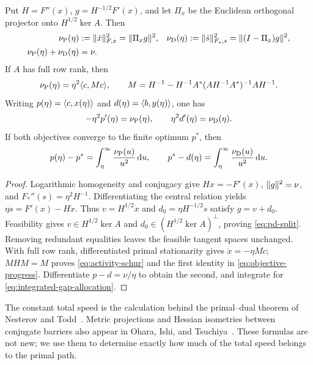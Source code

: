 \begin{proposition}
\label{prop:pd-split}
Put $H=F''(x)$, $g=H^{-1/2}F'(x)$, and let $\Pi_x$ be the Euclidean
orthogonal projector onto $H^{1/2}\ker A$. Then
\begin{align}
 \nu_{\rm P}(\eta)&:=\lVert \dot x\rVert_{F,x}^2=\lVert \Pi_xg\rVert^2,
 &\nu_{\rm D}(\eta)&:=\lVert \dot s\rVert_{F_*,s}^2
       =\lVert (I-\Pi_x)g\rVert^2,\notag\\
 \nu_{\rm P}(\eta)+\nu_{\rm D}(\eta)&=\nu.
 \label{eq:pd-split}
\end{align}
If $A$ has full row rank, then
\begin{equation}
 \nu_{\rm P}(\eta)=\eta^2\langle c,Mc\rangle,\qquad
 M=H^{-1}-H^{-1}A^*(AH^{-1}A^*)^{-1}AH^{-1}.
 \label{eq:activity-schur}
\end{equation}
Writing $p(\eta)=\langle c,x(\eta)\rangle$ and
$d(\eta)=\langle b,y(\eta)\rangle$, one has
\begin{equation}
 -\eta^2p'(\eta)=\nu_{\rm P}(\eta),\qquad
 \eta^2d'(\eta)=\nu_{\rm D}(\eta).
 \label{eq:objective-progress}
\end{equation}
If both objectives converge to the finite optimum $p^*$, then
\begin{equation}
 p(\eta)-p^*=\int_\eta^\infty\frac{\nu_{\rm P}(u)}{u^2}\,\mathrm d u,
 \qquad
 p^*-d(\eta)=\int_\eta^\infty\frac{\nu_{\rm D}(u)}{u^2}\,\mathrm d u.
 \label{eq:integrated-gap-allocation}
\end{equation}
\end{proposition}
\begin{proof}
Logarithmic homogeneity and conjugacy give
$Hx=-F'(x)$, $\lVert g\rVert^2=\nu$, and
$F_*''(s)=\eta^2H^{-1}$. Differentiating the central relation yields
$\eta\dot s=F'(x)-H\dot x$.
Thus $v=H^{1/2}\dot x$ and
$d_0=\eta H^{-1/2}\dot s$ satisfy $g=v+d_0$.
Feasibility gives $v\in H^{1/2}\ker A$ and
$d_0\in(H^{1/2}\ker A)^\perp$, proving \eqref{eq:pd-split}.
Removing redundant equalities leaves the feasible tangent spaces unchanged.
With full row rank, differentiated primal stationarity gives $\dot x=-\eta Mc$;
$MHM=M$ proves \eqref{eq:activity-schur} and the first identity in
\eqref{eq:objective-progress}.
Differentiate $p-d=\nu/\eta$ to obtain the second, and integrate for
\eqref{eq:integrated-gap-allocation}.
\end{proof}
The constant total speed is the calculation behind the primal--dual
theorem of Nesterov and Todd~\cite[Theorems~4.1 and~5.2]{NesterovTodd2002}.
Metric projections and Hessian isometries between conjugate barriers
also appear in Ohara, Ishi, and
Tsuchiya~\cite[Sections~4--5]{OharaIshiTsuchiya2024}. These
formulas are not new; we use them to determine exactly how much of the
total speed belongs to the primal path.

